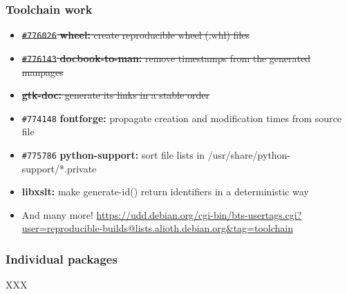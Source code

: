 \documentclass[14pt]{beamer}
\begin{document}
\begin{frame}
 \frametitle{Toolchain work}

 \begin{itemize}\small
  \item \sout{\texttt{\#776026} \textbf{wheel:} create reproducible wheel (.whl) files}
  \item \sout{\texttt{\#776143} \textbf{docbook-to-man:} remove timestamps from the generated manpages}
  \item \sout{\textbf{gtk-doc:} generate its links in a stable order}
  \item \texttt{\#774148} \textbf{fontforge:} propagate creation and modification times from source file
  \item \texttt{\#775786} \textbf{python-support:} sort file lists in /usr/share/python-support/*.private
  \item \textbf{libxslt:} make generate-id() return identifiers in a deterministic way
  \item And many more! \footnotesize{\url{https://udd.debian.org/cgi-bin/bts-usertags.cgi?user=reproducible-builds@lists.alioth.debian.org&tag=toolchain}}
 \end{itemize}
\end{frame}

\begin{frame}
 \frametitle{Individual packages}

 XXX
\end{frame}

\begin{frame}[plain]
\end{frame}
\end{document}
